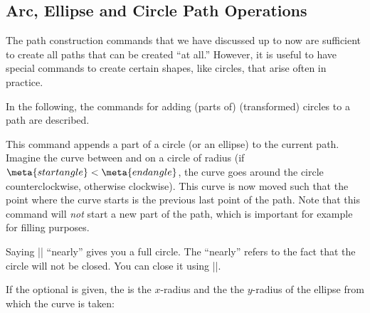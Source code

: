 \subsection{Arc, Ellipse and Circle Path Operations}

The path construction commands that we have discussed up to now are
sufficient to create all paths that can be created ``at all.''
However, it is useful to have special commands to create certain
shapes, like circles, that arise often in practice.

In the following, the commands for adding (parts of) (transformed)
circles to a path are described.

\begin{command}{\pgfpatharc{}}
  This command appends a part of a circle (or an ellipse) to the current
  path. Imagine the curve between  and  on a circle of radius  (if $\meta{start angle}
  < \meta{end angle}$, the curve goes around the circle
  counterclockwise, otherwise clockwise). This curve is now moved such
  that the point where the curve starts is the previous last point of the
  path. Note that this command will \emph{not} start a new part of the
  path, which is important for example for filling purposes.

\begin{codeexample}[]
\end{codeexample}

  Saying || ``nearly'' gives you a full
  circle. The ``nearly'' refers to the fact that the circle will not
  be closed. You can close it using |\pgfpathclose|.

  If the optional  is given, the  is the
  $x$-radius and the  the $y$-radius of the ellipse
  from which the curve is taken:

\begin{codeexample}[]
\end{codeexample}


\end{command}
